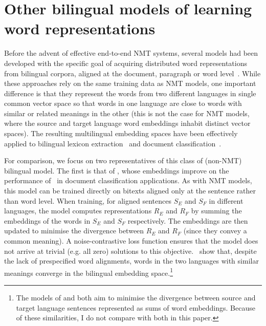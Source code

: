 \section{Other bilingual models of learning word representations}
Before the advent of effective end-to-end NMT systems, several models had been developed with the specific goal of acquiring distributed word representations from bilingual corpora, aligned at the document, paragraph or word level~\citep{Haghighi2008Learning,vulic2011identifying,mikolov2013exploiting,Hermann:2014:ICLR,lauly2014autoencoder}. While these approaches rely on the same training data as NMT models, one important difference is that they represent the words from two different languages in single common vector space so that words in one language are close to words with similar or related meanings in the other (this is not the case for NMT models, where the source and target language word embeddings inhabit distinct vector spaces). The resulting multilingual embedding spaces have been effectively applied to bilingual lexicon extraction~\citep{Haghighi2008Learning,vulic2011identifying,mikolov2013exploiting} and document classification~\citep{Klementiev,Hermann:2014:ICLR,lauly2014autoencoder,Kocisky:2014}.

For comparison, we focus on two representatives of this class of (non-NMT) bilingual model. The first is that of \cite{Hermann:2014:ICLR}, whose embeddings improve on the performance of~\cite{Klementiev} in document classification applications. As with NMT models, this model can be trained directly on bitexts aligned only at the sentence rather than word level. When training, for aligned sentences \(S_E\) and \(S_F\) in different languages, the model computes representations \(R_E\) and \(R_F\) by summing the embeddings of the words in \(S_E\) and \(S_F\) respectively. The embeddings are then updated to minimise the divergence between \(R_E\) and \(R_F\) (since they convey a common meaning). A noise-contrastive loss function ensures that the model does not arrive at trivial (e.g. all zero) solutions to this objective.~\cite{Hermann:2014:ICLR} show that, despite the lack of prespecified word alignments, words in the two languages with similar meanings converge in the bilingual embedding space.\footnote{The models of \cite{lauly2014autoencoder} and \cite{Hermann:2014:ICLR} both aim to minimise the divergence between source and target language sentences represented as sums of word embeddings. Because of these similarities, I do not compare with both in this paper.}

